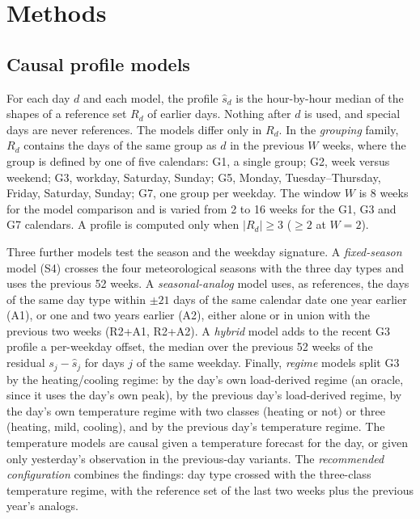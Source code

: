 \documentclass[conference]{IEEEtran}
\begin{document}
\section{Methods}
\subsection{Causal profile models}
For each day $d$ and each model, the profile $\hat{s}_d$ is the hour-by-hour median of the shapes of a reference set $R_d$ of earlier days. Nothing after $d$ is used, and special days are never references. The models differ only in $R_d$. In the \emph{grouping} family, $R_d$ contains the days of the same group as $d$ in the previous $W$ weeks, where the group is defined by one of five calendars: G1, a single group; G2, week versus weekend; G3, workday, Saturday, Sunday; G5, Monday, Tuesday--Thursday, Friday, Saturday, Sunday; G7, one group per weekday. The window $W$ is 8 weeks for the model comparison and is varied from 2 to 16 weeks for the G1, G3 and G7 calendars. A profile is computed only when $|R_d| \ge 3$ ($\ge 2$ at $W=2$).

Three further models test the season and the weekday signature. A \emph{fixed-season} model (S4) crosses the four meteorological seasons with the three day types and uses the previous 52 weeks. A \emph{seasonal-analog} model uses, as references, the days of the same day type within $\pm 21$ days of the same calendar date one year earlier (A1), or one and two years earlier (A2), either alone or in union with the previous two weeks (R2+A1, R2+A2). A \emph{hybrid} model adds to the recent G3 profile a per-weekday offset, the median over the previous 52 weeks of the residual $s_j - \hat{s}_j$ for days $j$ of the same weekday. Finally, \emph{regime} models split G3 by the heating/cooling regime: by the day's own load-derived regime (an oracle, since it uses the day's own peak), by the previous day's load-derived regime, by the day's own temperature regime with two classes (heating or not) or three (heating, mild, cooling), and by the previous day's temperature regime. The temperature models are causal given a temperature forecast for the day, or given only yesterday's observation in the previous-day variants. The \emph{recommended configuration} combines the findings: day type crossed with the three-class temperature regime, with the reference set of the last two weeks plus the previous year's analogs.
\end{document}
